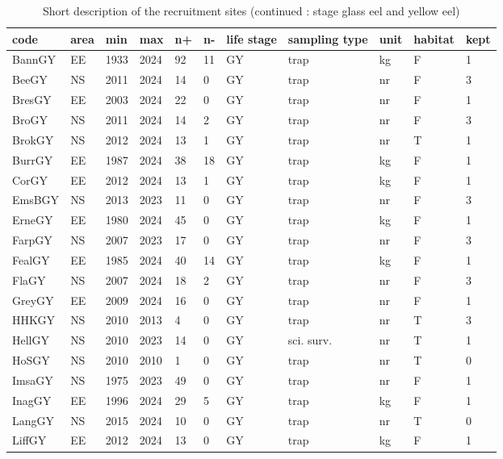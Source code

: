 \begin{table}[htbp]
\centering
\caption{Short description of the recruitment sites (continued : stage glass eel and yellow eel)} 
\label{statseriesGY}
\begin{tabular}{p{1cm}p{1cm}p{1cm}p{1cm}p{0.8cm}p{0.8cm}p{1cm}p{2cm}p{2cm}p{1cm}p{1cm}}
  \hline
code & area & min & max & n+ & n- & life stage & sampling type & unit & habitat & kept \\ 
  \hline
BannGY & EE & 1933 & 2024 & 92 & 11 & GY & trap & kg & F & 1 \\ 
  BeeGY & NS & 2011 & 2024 & 14 & 0 & GY & trap & nr & F & 3 \\ 
  BresGY & EE & 2003 & 2024 & 22 & 0 & GY & trap & nr & F & 1 \\ 
  BroGY & NS & 2011 & 2024 & 14 & 2 & GY & trap & nr & F & 3 \\ 
  BrokGY & NS & 2012 & 2024 & 13 & 1 & GY & trap & nr & T & 1 \\ 
  BurrGY & EE & 1987 & 2024 & 38 & 18 & GY & trap & kg & F & 1 \\ 
  CorGY & EE & 2012 & 2024 & 13 & 1 & GY & trap & kg & F & 1 \\ 
  EmsBGY & NS & 2013 & 2023 & 11 & 0 & GY & trap & nr & F & 3 \\ 
  ErneGY & EE & 1980 & 2024 & 45 & 0 & GY & trap & kg & F & 1 \\ 
  FarpGY & NS & 2007 & 2023 & 17 & 0 & GY & trap & nr & F & 3 \\ 
  FealGY & EE & 1985 & 2024 & 40 & 14 & GY & trap & kg & F & 1 \\ 
  FlaGY & NS & 2007 & 2024 & 18 & 2 & GY & trap & nr & F & 3 \\ 
  GreyGY & EE & 2009 & 2024 & 16 & 0 & GY & trap & nr & F & 1 \\ 
  HHKGY & NS & 2010 & 2013 & 4 & 0 & GY & trap & nr & T & 3 \\ 
  HellGY & NS & 2010 & 2023 & 14 & 0 & GY & sci. surv. & nr & T & 1 \\ 
  HoSGY & NS & 2010 & 2010 & 1 & 0 & GY & trap & nr & T & 0 \\ 
  ImsaGY & NS & 1975 & 2023 & 49 & 0 & GY & trap & nr & F & 1 \\ 
  InagGY & EE & 1996 & 2024 & 29 & 5 & GY & trap & kg & F & 1 \\ 
  LangGY & NS & 2015 & 2024 & 10 & 0 & GY & trap & nr & T & 0 \\ 
  LiffGY & EE & 2012 & 2024 & 13 & 0 & GY & trap & kg & F & 1 \\ 

\end{tabular}
\end{table}
